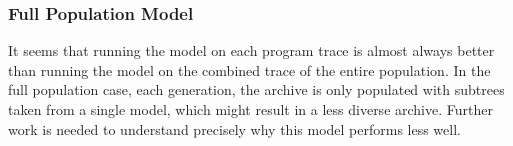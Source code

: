 

\subsubsection{Full Population Model}
It seems that running the model on each program trace is almost always better than running the model on the combined trace of the entire population.  In the full population case, each generation, the archive is only populated with subtrees taken from a single model, which might result in a less diverse archive.  Further work is needed to understand precisely why this model performs less well.

